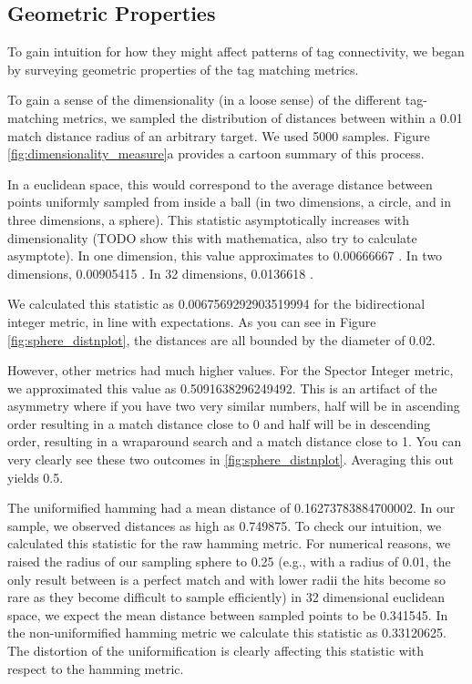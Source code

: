 \subsection{Geometric Properties}

To gain intuition for how they might affect patterns of tag connectivity, we began by surveying geometric properties of the tag matching metrics.





To gain a sense of the dimensionality (in a loose sense) of the different tag-matching metrics, we sampled the distribution of distances between within a 0.01 match distance radius of an arbitrary target.
We used 5000 samples.
Figure \ref{fig:dimensionality_measure}a provides a cartoon summary of this process.

In a euclidean space, this would correspond to the average distance between points uniformly sampled from inside a ball (in two dimensions, a circle, and in three dimensions, a sphere).
This statistic asymptotically increases with dimensionality (TODO show this with mathematica, also try to calculate asymptote).
In one dimension, this value approximates to 0.00666667 \citep{dunbar1997average}.
In two dimensions, 0.00905415 \citep{dunbar1997average}.
In 32 dimensions, 0.0136618 \citep{dunbar1997average}.

We calculated this statistic as  0.0067569292903519994 for the bidirectional integer metric, in line with expectations.
As you can see in Figure \ref{fig:sphere_distnplot}, the distances are all bounded by the diameter of 0.02.

However, other metrics had much higher values.
For the Spector Integer metric, we approximated this value as 0.5091638296249492.
This is an artifact of the asymmetry where if you have two very similar numbers, half will be in ascending order resulting in a match distance close to 0 and half will be in descending order, resulting in a wraparound search and a match distance close to 1.
You can very clearly see these two outcomes in \ref{fig:sphere_distnplot}.
Averaging this out yields 0.5.

The uniformified hamming had a mean distance of 0.16273783884700002.
In our sample, we observed distances as high as 0.749875.
To check our intuition, we calculated this statistic for the raw hamming metric.
For numerical reasons, we raised the radius of our sampling sphere to 0.25 (e.g., with a radius of 0.01, the only result between is a perfect match and with lower radii the hits become so rare as they become difficult to sample efficiently)
in 32 dimensional euclidean space, we expect the mean distance between sampled points to be 0.341545.
In the non-uniformified hamming metric we calculate this statistic as 0.33120625.
The distortion of the uniformification is clearly affecting this statistic with respect to the hamming metric.


